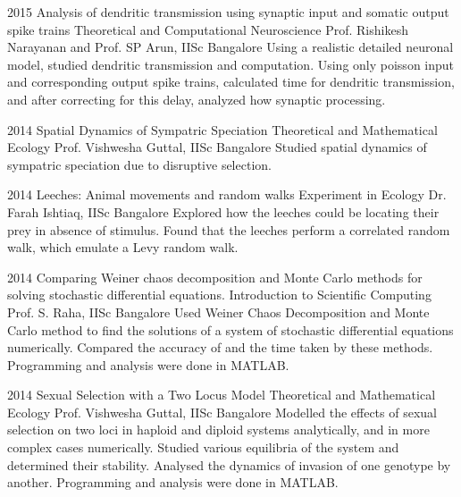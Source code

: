 \documentclass[11pt]{friggeri-cv}%
\begin{document}
\begin{entrylist}
\entry
    {2015}
    {Analysis of dendritic transmission using synaptic input and somatic output spike trains}
    {Theoretical and Computational Neuroscience}
    {
    Prof. Rishikesh Narayanan and Prof. SP Arun, IISc Bangalore}
    {Using a realistic detailed neuronal model, studied dendritic transmission and computation. Using only poisson input and corresponding output spike trains, calculated time for dendritic transmission, and after correcting for this delay, analyzed how synaptic processing.}    
\end{entrylist}
\begin{entrylist}
\entry
    {2014}
    {Spatial Dynamics of Sympatric Speciation}
    {Theoretical and Mathematical Ecology}
    {
    Prof. Vishwesha Guttal, IISc Bangalore}
    {Studied spatial dynamics of sympatric speciation due to disruptive selection. 
    }    
\end{entrylist}
\begin{entrylist}
\entry
    {2014}
    {Leeches:
Animal movements and random walks}
    {Experiment in Ecology}
    {
    Dr. Farah Ishtiaq, IISc Bangalore}
    {Explored how the leeches could be locating their prey in absence of stimulus. Found that the leeches perform a correlated random walk, which emulate a Levy random walk.
    }    
\end{entrylist}
\begin{entrylist}
  \entry
    {2014}
    {Comparing Weiner chaos decomposition and Monte Carlo methods for solving stochastic differential equations.}
    {Introduction to Scientific Computing}
    {
    Prof. S. Raha, IISc Bangalore}
    {Used Weiner Chaos Decomposition and Monte Carlo method to find the solutions of a system of stochastic differential equations numerically. Compared the accuracy  of and the time taken by these methods. Programming and analysis were done in MATLAB.
    }    
\end{entrylist}
\begin{entrylist}
\entry
    {2014}
    {Sexual Selection with a Two Locus Model}
    {Theoretical and Mathematical Ecology}
    {
    Prof. Vishwesha Guttal, IISc Bangalore}
    {Modelled the effects of sexual selection on two loci in haploid and diploid systems analytically, and in more complex cases numerically. Studied various equilibria of the system and determined their stability. Analysed the dynamics of invasion of one genotype by another. Programming and analysis were done in MATLAB.
    }    
\end{entrylist}
\end{document}
